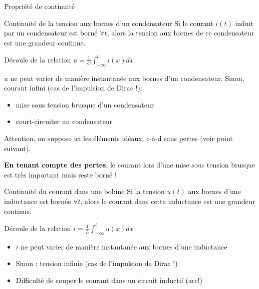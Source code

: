 \begin{frame}[allowframebreaks]{Propriété de continuité}

  \begin{block}{Continuité de la tension aux bornes d'un condensateur}
    Si le courant $i(t)$ induit par un condensateur est borné $\forall t$, alors la tension aux bornes de ce condensateur est une grandeur continue.    
  \end{block}
Découle de la relation $ u=\frac{1}{C} \int_{-\infty}^{t} i(x) dx$

$u$ ne peut varier de manière instantanée aux bornes d'un condensateur. 
Sinon, courant infini (cas de l'impulsion de Dirac !):
\begin{itemize}
  \item mise sous tension brusque d'un condensateur
  \item court-circuiter un condensateur
\end{itemize}
Attention, on suppose ici les éléments idéaux, c-à-d sans pertes (voir point suivant). 


\textbf{En tenant compte des pertes}, le courant lors d'une mise sous tension brusque est très important mais reste borné !

\newpage
\begin{block}{Continuité du courant dans une bobine}
   Si la tension $u(t)$ aux bornes d'une inductance est bornée $\forall t$, alors le courant dans cette inductance est une grandeur continue.
\end{block}


Découle de la relation $i=\frac{1}{L} \int_{-\infty}^{t} u(x) dx$
\begin{itemize}
  \item $i$ ne peut varier de manière instantanée aux bornes d'une inductance
  \item Sinon : tension infinie (cas de l'impulsion de Dirac !)
  \item Difficulté de couper le courant dans un circuit inductif (arc!)
\end{itemize}
\end{frame}

